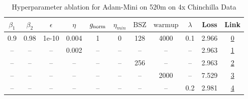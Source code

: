\begin{table}[H]
\centering
\caption{Hyperparameter ablation for Adam-Mini on 520m on 4x Chinchilla Data}
\label{tab:ablation_adam-mini_520m_on_4x_chinchilla_data}
\begin{tabular}{ccccccccccc}
\toprule
$\beta_1$ & $\beta_2$ & $\epsilon$ & $\eta$ & $g_{\mathrm{norm}}$ & $\eta_{min}$ & $\mathrm{BSZ}$ & $\mathrm{warmup}$ & $\lambda$ & Loss & Link \\
\midrule
0.9 & 0.98 & 1e-10 & 0.004 & 1 & 0 & 128 & 4000 & 0.1 & 2.966 & \href{https://wandb.ai/marin-community/optimizer-scaling/runs/sweep-520m-42B-minikdfe5aclr0.004-wd0.1-minlr0-warmup4000-b10.9--5de7af}{0} \\
\midrule
-- & -- & -- & 0.002 & -- & -- & -- & -- & -- & 2.963 & \href{https://wandb.ai/marin-community/optimizer-scaling/runs/sweep-520m-42B-minik6bf656lr0.002-wd0.1-minlr0-warmup4000-b10.9--a9507c}{1} \\
-- & -- & -- & -- & -- & -- & 256 & -- & -- & 2.963 & \href{https://wandb.ai/marin-community/optimizer-scaling/runs/sweep-520m-42B-minik4e584elr0.004-wd0.1-minlr0-warmup4000-b10.9--3eca5c}{2} \\
-- & -- & -- & -- & -- & -- & -- & 2000 & -- & 7.529 & \href{https://wandb.ai/marin-community/optimizer-scaling/runs/sweep-520m-42B-minikb765f6lr0.004-wd0.1-minlr0-warmup2000-b10.9--520ca1}{3} \\
-- & -- & -- & -- & -- & -- & -- & -- & 0.2 & 2.981 & \href{https://wandb.ai/marin-community/optimizer-scaling/runs/sweep-520m-42B-miniba6697lr0.004-wd0.2-minlr0-warmup4000-b10.9-b-2db890}{4} \\
\bottomrule
\end{tabular}
\end{table}

